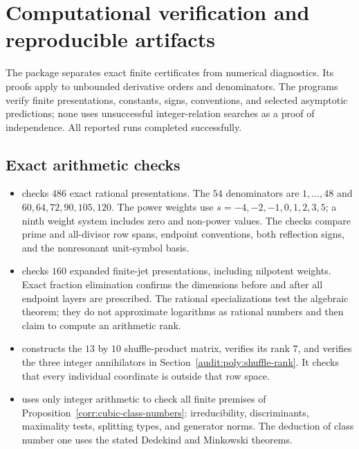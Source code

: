 \section{Computational verification and reproducible artifacts}
\label{verification:section}

The package separates exact finite certificates from numerical
diagnostics. Its proofs apply to unbounded derivative orders and
denominators. The programs verify finite presentations, constants,
signs, conventions, and selected asymptotic predictions; none uses
unsuccessful integer-relation searches as a proof of independence.
All reported runs completed successfully.

\subsection{Exact arithmetic checks}

\begin{itemize}
\item {} checks $486$ exact rational
presentations. The $54$ denominators are $1,\ldots,48$ and
$60,64,72,90,105,120$. The power weights use
$s=-4,-2,-1,0,1,2,3,5$; a ninth weight system includes zero and
non-power values. The checks compare prime and all-divisor row
spans, endpoint conventions, both reflection signs, and the
nonresonant unit-symbol basis.
\item {} checks $160$ expanded finite-jet
presentations, including nilpotent weights. Exact fraction elimination
confirms the dimensions before and after all endpoint layers are
prescribed. The rational specializations test the algebraic theorem;
they do not approximate logarithms as rational numbers and then claim
to compute an arithmetic rank.
\item {} constructs the $13$ by $10$
shuffle-product matrix, verifies its rank $7$, and verifies the three
integer annihilators in Section~\ref{audit:poly:shuffle-rank}. It checks
that every individual coordinate is outside that row space.
\item {} uses only integer
arithmetic to check all finite premises of
Proposition~\ref{corr:cubic-class-numbers}: irreducibility,
discriminants, maximality tests, splitting types, and generator norms.
The deduction of class number one uses the stated Dedekind and
Minkowski theorems.
\end{itemize}

